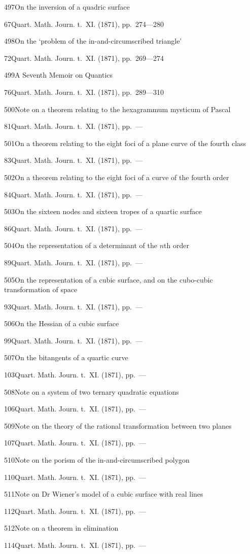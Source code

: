 \documentclass[11pt,a4paper]{book}
\providecommand{\tocentry}[2]{#1\dotfill #2\par}
\begin{document}
\tocentry{497}{On the inversion of a quadric surface}{67}{Quart. Math. Journ. t.~XI. (1871), pp.~274---280}

\tocentry{498}{On the `problem of the in-and-circumscribed triangle'}{72}{Quart. Math. Journ. t.~XI. (1871), pp.~269---274}

\tocentry{499}{A Seventh Memoir on Quantics}{76}{Quart. Math. Journ. t.~XI. (1871), pp.~289---310}

\tocentry{500}{Note on a theorem relating to the hexagrammum mysticum of Pascal}{81}{Quart. Math. Journ. t.~XI. (1871), pp.~---}

\tocentry{501}{On a theorem relating to the eight foci of a plane curve of the fourth class}{83}{Quart. Math. Journ. t.~XI. (1871), pp.~---}

\tocentry{502}{On a theorem relating to the eight foci of a curve of the fourth order}{84}{Quart. Math. Journ. t.~XI. (1871), pp.~---}

\tocentry{503}{On the sixteen nodes and sixteen tropes of a quartic surface}{86}{Quart. Math. Journ. t.~XI. (1871), pp.~---}

\tocentry{504}{On the representation of a determinant of the $n$th order}{89}{Quart. Math. Journ. t.~XI. (1871), pp.~---}

\tocentry{505}{On the representation of a cubic surface, and on the cubo-cubic transformation of space}{93}{Quart. Math. Journ. t.~XI. (1871), pp.~---}

\tocentry{506}{On the Hessian of a cubic surface}{99}{Quart. Math. Journ. t.~XI. (1871), pp.~---}

\newpage

\tocentry{507}{On the bitangents of a quartic curve}{103}{Quart. Math. Journ. t.~XI. (1871), pp.~---}

\tocentry{508}{Note on a system of two ternary quadratic equations}{106}{Quart. Math. Journ. t.~XI. (1871), pp.~---}

\tocentry{509}{Note on the theory of the rational transformation between two planes}{107}{Quart. Math. Journ. t.~XI. (1871), pp.~---}

\tocentry{510}{Note on the porism of the in-and-circumscribed polygon}{110}{Quart. Math. Journ. t.~XI. (1871), pp.~---}

\tocentry{511}{Note on Dr Wiener's model of a cubic surface with real lines}{112}{Quart. Math. Journ. t.~XI. (1871), pp.~---}

\tocentry{512}{Note on a theorem in elimination}{114}{Quart. Math. Journ. t.~XI. (1871), pp.~---}
\end{document}
